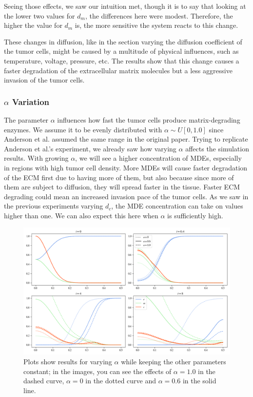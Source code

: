 Seeing those effects, we saw our intuition met, though it is to say that looking at the lower two values for $d_m$, the differences here were modest. Therefore, the higher the value for $d_m$ is, the more sensitive the system reacts to this change.

These changes in diffusion, like in the section varying the diffusion coefficient of the tumor cells, might be caused by a multitude of physical influences, such as temperature, voltage, pressure, etc. The results show that this change causes a faster degradation of the extracellular matrix molecules but a less aggressive invasion of the tumor cells. 

\subsubsection*{$\alpha$ Variation}
The parameter $\alpha$ influences how fast the tumor cells produce matrix-degrading enzymes. We assume it to be evenly distributed with $\alpha \sim U[0, 1.0]$ since Anderson et al. assumed the same range in the original paper. Trying to replicate Anderson et al.'s experiment, we already saw how varying $\alpha$ affects the simulation results. With growing $\alpha$, we will see a higher concentration of MDEs, especially in regions with high tumor cell density. More MDEs will cause faster degradation of the ECM first due to having more of them, but also because since more of them are subject to diffusion, they will spread faster in the tissue. Faster ECM degrading could mean an increased invasion pace of the tumor cells. As we saw in the previous experiments varying $d_c$, the MDE concentration can take on values higher than one. We can also expect this here when $\alpha$ is sufficiently high. 
\begin{figure}[h]
 \centering
 \includegraphics[width=\textwidth]{resources/images/alpha_variation.png}
 \caption{Plots show results for varying $\alpha$ while keeping the other parameters constant; in the images, you can see the effects of $\alpha=1.0$ in the dashed curve, $\alpha=0$ in the dotted curve and $\alpha=0.6$ in the solid line.}
 \label{fig:alpha_variation}
\end{figure}

